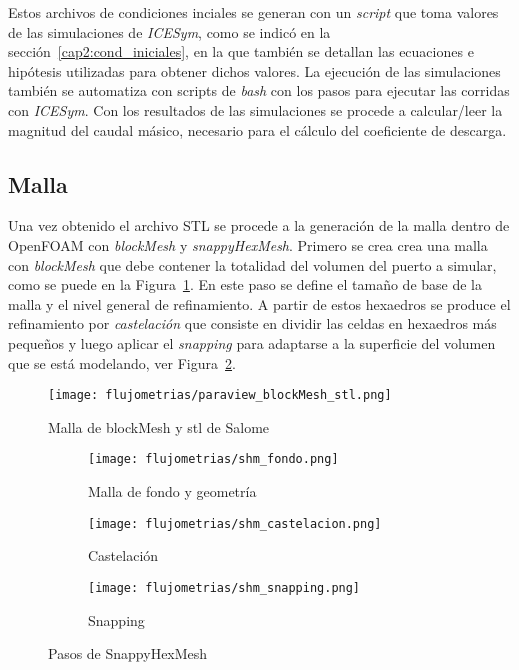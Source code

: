 Estos archivos de condiciones inciales se generan con un \emph{script} que toma
valores de las simulaciones de \emph{ICESym}, como se indicó en la
sección~\ref{cap2:cond_iniciales}, en la que también se detallan las ecuaciones
e hipótesis utilizadas para obtener dichos valores.
%
La ejecución de las simulaciones también se automatiza con scripts de
\emph{bash} con los pasos para ejecutar las corridas con \emph{ICESym}.
%
Con los resultados de las simulaciones se procede a calcular/leer la magnitud
del caudal másico, necesario para el cálculo del coeficiente de descarga.


\subsection{Malla}\label{sec:cap3_of_malla}
%
Una vez obtenido el archivo STL se procede a la generación de la malla dentro de
OpenFOAM con \emph{blockMesh} y \emph{snappyHexMesh}.
%
Primero se crea crea una malla con \emph{blockMesh} que  debe contener la
totalidad del volumen del puerto a simular, como se puede en la
Figura~\ref{fig:paraview_blockMesh_stl}.
%
En este paso se define el tamaño de base de la malla y el nivel general de
refinamiento.
%
A partir de estos hexaedros se produce el refinamiento por \emph{castelación}
que consiste en dividir las celdas en hexaedros más pequeños y luego aplicar el
\emph{snapping} para adaptarse a la superficie del volumen que se está
modelando, ver Figura~\ref{fig:openfoam_shm_pasos}.
%

\begin{figure}
    \centering
    \texttt{[image: flujometrias/paraview\_blockMesh\_stl.png]}
    \caption{Malla de blockMesh y stl de Salome}\label{fig:paraview_blockMesh_stl}
\end{figure}

\begin{figure}[t!]
    \centering
    \begin{subfigure}[t]{0.5\textwidth}
        \centering
        \texttt{[image: flujometrias/shm\_fondo.png]}
        \caption{Malla de fondo y geometría}
    \end{subfigure}%
    \begin{subfigure}[t]{0.5\textwidth}
        \centering
        \texttt{[image: flujometrias/shm\_castelacion.png]}
        \caption{Castelación}
    \end{subfigure}
    \begin{subfigure}[t]{0.5\textwidth}
        \centering
        \texttt{[image: flujometrias/shm\_snapping.png]}
        \caption{Snapping}
    \end{subfigure}
    \caption{Pasos de SnappyHexMesh\parencite{shm_steps}}\label{fig:openfoam_shm_pasos}
\end{figure}

